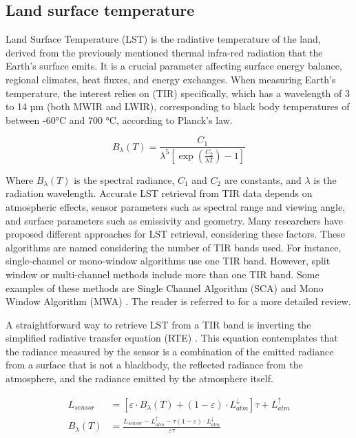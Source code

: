     \subsection{Land surface temperature}


        Land Surface Temperature (LST) is the radiative temperature of the land, derived from the previously mentioned thermal infra-red radiation that the Earth's surface emits. It is a crucial parameter affecting surface energy balance, regional climates, heat fluxes, and energy exchanges.
        When measuring Earth's temperature, the interest relies on (TIR) specifically, which has a wavelength of 3 to 14 µm (both MWIR and LWIR), corresponding to black body temperatures of between -60°C and 700 °C, according to Planck's law.

        \begin{equation}
            B_{\lambda}(T) = \frac{C_1}{\lambda^5 \left[ \exp\left(\frac{C_2}{\lambda T}\right) - 1\right]}
        \end{equation}

        Where $B_{\lambda}(T)$ is the spectral radiance, $C_1$ and $C_2$ are constants, and $\lambda$ is the radiation wavelength. 
        Accurate LST retrieval from TIR data depends on atmospheric effects, sensor parameters such as spectral range and viewing angle, and surface parameters such as emissivity and geometry. Many researchers have proposed different approaches for LST retrieval, considering these factors.
        These algorithms are named considering the number of TIR bands used. For instance, single-channel or mono-window algorithms use one TIR band. However, split window or multi-channel methods include more than one TIR band. Some examples of these methods are Single Channel Algorithm (SCA) \cite{sca2009} and Mono Window Algorithm (MWA) \cite{mwa2001}. The reader is referred to \cite{LI201314} for a more detailed review.


        A straightforward way to retrieve LST from a TIR band is inverting the simplified radiative transfer equation (RTE) \cite{becker90}. This equation contemplates that the radiance measured by the sensor is a combination of the emitted radiance from a surface that is not a blackbody, the reflected radiance from the atmosphere, and the radiance emitted by the atmosphere itself.


        \begin{equation}
            \begin{aligned}
            L_{sensor} &= \left[ \varepsilon \cdot B_{\lambda}(T) + (1 - \varepsilon) \cdot L_{atm}^{\downarrow} \right] \tau + L_{atm}^{\uparrow} \\
            B_\lambda (T) &= \frac{L_{sensor} - L_{atm}^{\uparrow}- \tau (1 - \varepsilon) \cdot L_{atm}^{\downarrow}}{\varepsilon \tau} 
            \end{aligned}
        \end{equation}

